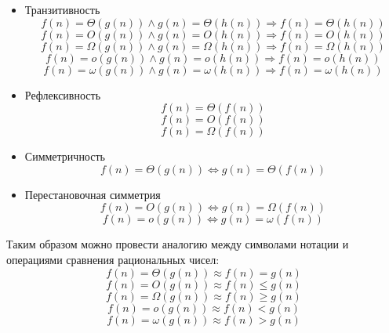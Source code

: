 \documentclass[11pt]{article}
\begin{document}
\begin{itemize}
\item Транзитивность
\begin{equation*}
  f(n) = \Theta(g(n)) \land g(n) = \Theta(h(n)) \Rightarrow f(n) = \Theta(h(n))
\end{equation*}
\begin{equation*}
  f(n) = O(g(n)) \land g(n) = O(h(n)) \Rightarrow f(n) = O(h(n))
\end{equation*}
\begin{equation*}
  f(n) = \Omega(g(n)) \land g(n) = \Omega(h(n)) \Rightarrow f(n) = \Omega(h(n))
\end{equation*}
\begin{equation*}
  f(n) = o(g(n)) \land g(n) = o(h(n)) \Rightarrow f(n) = o(h(n))
\end{equation*}
\begin{equation*}
  f(n) = \omega(g(n)) \land g(n) = \omega(h(n)) \Rightarrow f(n) = \omega(h(n))
\end{equation*}

\item Рефлексивность
\begin{equation*}
  f(n) = \Theta(f(n))
\end{equation*}
\begin{equation*}
  f(n) = O(f(n))
\end{equation*}
\begin{equation*}
  f(n) = \Omega(f(n))
\end{equation*}

\item Симметричность
\begin{equation*}
  f(n) = \Theta(g(n)) \iff g(n) = \Theta(f(n))
\end{equation*}

\item Перестановочная симметрия
\begin{equation*}
  f(n) = O(g(n)) \iff g(n) = \Omega(f(n))
\end{equation*}
\begin{equation*}
  f(n) = o(g(n)) \iff g(n) = \omega(f(n))
\end{equation*}
\end{itemize}

Таким образом можно провести аналогию между символами нотации и операциями
сравнения рациональных чисел:
\begin{equation*}
  f(n) = \Theta(g(n)) \approx f(n) = g(n)
\end{equation*}
\begin{equation*}
  f(n) = O(g(n)) \approx f(n) \leqslant  g(n)
\end{equation*}
\begin{equation*}
  f(n) = \Omega(g(n)) \approx f(n) \geqslant g(n)
\end{equation*}
\begin{equation*}
  f(n) = o(g(n)) \approx f(n) < g(n)
\end{equation*}
\begin{equation*}
  f(n) = \omega(g(n)) \approx f(n) > g(n)
\end{equation*}
\end{document}
